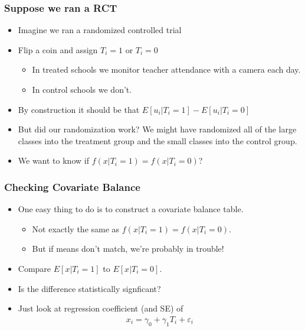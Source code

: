 \documentclass[xcolor=pdftex,dvipsnames,table,mathserif,aspectratio=169]{beamer}
\begin{document}
\begin{frame}
\frametitle{Suppose we ran a RCT}
\begin{itemize}
\item Imagine we ran a \alert{randomized controlled trial}
\item Flip a coin and assign $T_i=1$ or $T_i=0$
\begin{itemize}
\item In \alert{treated} schools we monitor teacher attendance with a camera each day.
\item In \alert{control} schools we don't.
\end{itemize}
\item By construction it should be that $E[u_i | T_i =1 ] - E[u_i | T_i=0]$
\item But did our randomization work? We might have randomized all of the large classes into the treatment group and the small classes into the control group.
\item We want to know if $f(x | T_i=1) = f(x | T_i =0)$?
\end{itemize}
\end{frame}

\begin{frame}
\frametitle{Checking Covariate Balance}
\begin{itemize}
\item One easy thing to do is to construct a \alert{covariate balance table}.
\begin{itemize}
\item Not exactly the same as $f(x | T_i=1) = f(x | T_i =0)$.
\item But if means don't match, we're probably in trouble!
\end{itemize}
\item Compare $E[x | T_i=1]$ to $E[x | T_i=0]$.
\item Is the difference statistically signficant?
\item Just look at regression coefficient (and SE) of 
\begin{align*}
x_i = \gamma_0 + \gamma_1 T_i + \varepsilon_i
\end{align*}
\end{itemize}
\end{frame}
\end{document}
